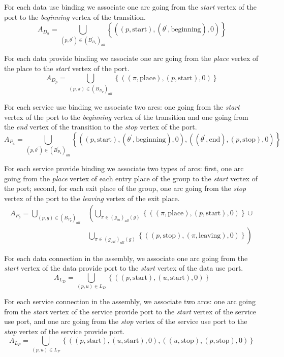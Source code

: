 For each data use binding we associate one arc going from the \emph{start}
vertex of the port to the \emph{beginning} vertex of the transition.
\[
A_{D_{u}}=\bigcup_{\left(p,\theta^{\prime}\right)\in\left(B_{D_{u}}^{\prime}\right)_{all}}\left\{ \left(\left(p,\text{start}\right),\left(\theta^{\prime},\text{beginning}\right),0\right)\right\} 
\]

For each data provide binding we associate one arc going from the
\emph{place} vertex of the place to the \emph{start} vertex of the
port. 
\[
A_{D_{p}}=\bigcup_{\left(p,\pi\right)\in\left(B_{D_{p}}\right)_{all}}\left\{ \left(\left(\pi,\text{place}\right),\left(p,\text{start}\right),0\right)\right\} 
\]

For each service use binding we associate two arcs: one going from
the \emph{start} vertex of the port to the \emph{beginning} vertex
of the transition and one going from the \emph{end} vertex of the
transition to the \emph{stop} vertex of the port. 
\[
A_{P_{u}}=\bigcup_{\left(p,\theta^{\prime}\right)\in\left(B_{P_{u}}^{\prime}\right)_{all}}\left\{ \left(\left(p,\text{start}\right),\left(\theta^{\prime},\text{beginning}\right),0\right),\left(\left(\theta^{\prime},\text{end}\right),\left(p,\text{stop}\right),0\right)\right\} 
\]

For each service provide binding we associate two types of arcs: first,
one arc going from the \emph{place} vertex of each entry place of
the group to the \emph{start} vertex of the port; second, for each
exit place of the group, one arc going from the \emph{stop} vertex
of the port to the \emph{leaving} vertex of the exit place. 
\begin{align*}
A_{P_{p}}=\bigcup_{\left(p,g\right)\in\left(B_{P_{p}}\right)_{all}} & \left( \bigcup_{\pi\in\left(g_{in}\right)_{all}\left(g\right)}\left\{ \left(\left(\pi,\text{place}\right),\left(p,\text{start}\right),0\right)\right\} \cup \right. \\
 & \left. \bigcup_{\pi\in\left(g_{out}\right)_{all}\left(g\right)}\left\{ \left(\left(p,\text{stop}\right),\left(\pi,\text{leaving}\right),0\right)\right\} \right)
\end{align*}

For each data connection in the assembly, we associate one arc going
from the \emph{start} vertex of the data provide port to the \emph{start}
vertex of the data use port. 
\[
A_{L_{D}}=\bigcup_{\left(p,u\right)\in L_{D}}\left\{ \left(\left(p,\text{start}\right),\left(u,\text{start}\right),0\right)\right\} 
\]

For each service connection in the assembly, we associate two arcs:
one arc going from the \emph{start} vertex of the service provide
port to the \emph{start} vertex of the service use port, and one arc
going from the \emph{stop} vertex of the service use port to the \emph{stop}
vertex of the service provide port. 
\[
A_{L_{P}}=\bigcup_{\left(p,u\right)\in L_{P}}\left\{ \left(\left(p,\text{start}\right),\left(u,\text{start}\right),0\right),\left(\left(u,\text{stop}\right),\left(p,\text{stop}\right),0\right)\right\} 
\]

